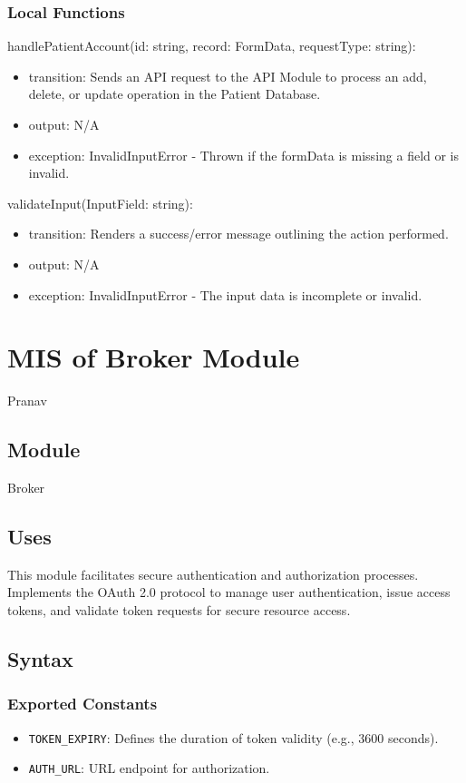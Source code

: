 \documentclass[12pt, titlepage]{article}
\begin{document}
\subsubsection{Local Functions}

\noindent handlePatientAccount(id: string, record: FormData, requestType: string):
\begin{itemize}
\item transition: Sends an API request to the API Module to process an add, delete, or update operation in the Patient Database.
\item output: N/A
\item exception: InvalidInputError - Thrown if the formData is missing a field or is invalid.
\end{itemize}

\noindent validateInput(InputField: string):
\begin{itemize}
\item transition: Renders a success/error message outlining the action performed.
\item output: N/A
\item exception: InvalidInputError - The input data is incomplete or invalid.
\end{itemize}

\newpage

\section{MIS of Broker Module } \label{Module_Broker} Pranav

\subsection{Module}
Broker

\subsection{Uses}

This module facilitates secure authentication and authorization processes. Implements the OAuth 2.0 protocol to manage user authentication, issue access tokens, and validate token requests for secure resource access.

\subsection{Syntax}

\subsubsection{Exported Constants}
\begin{itemize}
    \item \texttt{TOKEN\_EXPIRY}: Defines the duration of token validity (e.g., 3600 seconds).
    \item \texttt{AUTH\_URL}: URL endpoint for authorization.
\end{itemize}
\end{document}
